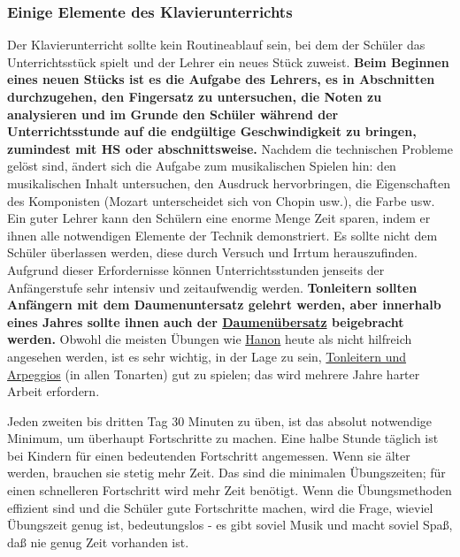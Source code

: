 
\subsubsection{Einige Elemente des Klavierunterrichts}
\label{c1iii16d}

Der Klavierunterricht sollte kein Routineablauf sein, bei dem der Schüler das Unterrichtsstück spielt und der Lehrer ein neues Stück zuweist.
\textbf{Beim Beginnen eines neuen Stücks ist es die Aufgabe des Lehrers, es in Abschnitten durchzugehen, den Fingersatz zu untersuchen, die Noten zu analysieren und im Grunde den Schüler während der Unterrichtsstunde auf die endgültige Geschwindigkeit zu bringen, zumindest mit HS oder abschnittsweise.}
Nachdem die technischen Probleme gelöst sind, ändert sich die Aufgabe zum musikalischen Spielen hin: den musikalischen Inhalt untersuchen, den Ausdruck hervorbringen, die Eigenschaften des Komponisten (Mozart unterscheidet sich von Chopin usw.), die Farbe usw.
Ein guter Lehrer kann den Schülern eine enorme Menge Zeit sparen, indem er ihnen alle notwendigen Elemente der Technik demonstriert.
Es sollte nicht dem Schüler überlassen werden, diese durch Versuch und Irrtum herauszufinden.
Aufgrund dieser Erfordernisse können Unterrichtsstunden jenseits der Anfängerstufe sehr intensiv und zeitaufwendig werden.
\textbf{Tonleitern sollten Anfängern mit dem Daumenuntersatz gelehrt werden, aber innerhalb eines Jahres sollte ihnen auch der \hyperref[c1iii5b]{Daumenübersatz} beigebracht werden.}
Obwohl die meisten Übungen wie \hyperref[c1iii7h]{Hanon} heute als nicht hilfreich angesehen werden, ist es sehr wichtig, in der Lage zu sein, \hyperref[c1iii5]{Tonleitern und Arpeggios} (in allen Tonarten)
gut zu spielen; das wird mehrere Jahre harter Arbeit erfordern.

Jeden zweiten bis dritten Tag 30 Minuten zu üben, ist das absolut notwendige Minimum, um überhaupt Fortschritte zu machen.
Eine halbe Stunde täglich ist bei Kindern für einen bedeutenden Fortschritt angemessen.
Wenn sie älter werden, brauchen sie stetig mehr Zeit.
Das sind die minimalen Übungszeiten; für einen schnelleren Fortschritt wird mehr Zeit benötigt.
Wenn die Übungsmethoden effizient sind und die Schüler gute Fortschritte machen, wird die Frage, wieviel Übungszeit genug ist, bedeutungslos - es gibt soviel Musik und macht soviel Spaß, daß nie genug Zeit vorhanden ist.

